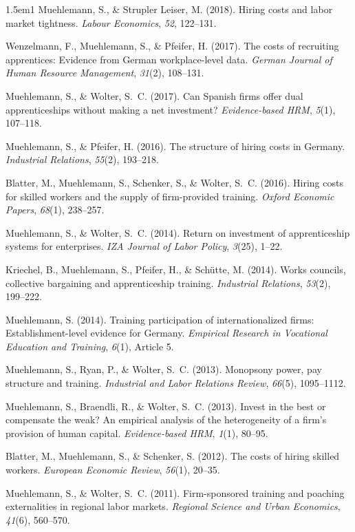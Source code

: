 \documentclass[11pt,a4paper]{article}
\begin{document}
\begin{hangparas}{1.5em}{1}
Muehlemann, S., \& Strupler Leiser, M. (2018). Hiring costs and labor market tightness. \textit{Labour Economics}, \textit{52}, 122--131.

Wenzelmann, F., Muehlemann, S., \& Pfeifer, H. (2017). The costs of recruiting apprentices: Evidence from German workplace-level data. \textit{German Journal of Human Resource Management}, \textit{31}(2), 108--131.

Muehlemann, S., \& Wolter, S.~C. (2017). Can Spanish firms offer dual apprenticeships without making a net investment? \textit{Evidence-based HRM}, \textit{5}(1), 107--118.

Muehlemann, S., \& Pfeifer, H. (2016). The structure of hiring costs in Germany. \textit{Industrial Relations}, \textit{55}(2), 193--218.

Blatter, M., Muehlemann, S., Schenker, S., \& Wolter, S.~C. (2016). Hiring costs for skilled workers and the supply of firm-provided training. \textit{Oxford Economic Papers}, \textit{68}(1), 238--257.

Muehlemann, S., \& Wolter, S.~C. (2014). Return on investment of apprenticeship systems for enterprises. \textit{IZA Journal of Labor Policy}, \textit{3}(25), 1--22.

Kriechel, B., Muehlemann, S., Pfeifer, H., \& Sch\"utte, M. (2014). Works councils, collective bargaining and apprenticeship training. \textit{Industrial Relations}, \textit{53}(2), 199--222.

Muehlemann, S. (2014). Training participation of internationalized firms: Establishment-level evidence for Germany. \textit{Empirical Research in Vocational Education and Training}, \textit{6}(1), Article 5.

Muehlemann, S., Ryan, P., \& Wolter, S.~C. (2013). Monopsony power, pay structure and training. \textit{Industrial and Labor Relations Review}, \textit{66}(5), 1095--1112.

Muehlemann, S., Braendli, R., \& Wolter, S.~C. (2013). Invest in the best or compensate the weak? An empirical analysis of the heterogeneity of a firm's provision of human capital. \textit{Evidence-based HRM}, \textit{1}(1), 80--95.

Blatter, M., Muehlemann, S., \& Schenker, S. (2012). The costs of hiring skilled workers. \textit{European Economic Review}, \textit{56}(1), 20--35.

Muehlemann, S., \& Wolter, S.~C. (2011). Firm-sponsored training and poaching externalities in regional labor markets. \textit{Regional Science and Urban Economics}, \textit{41}(6), 560--570.


\end{hangparas}
\end{document}
